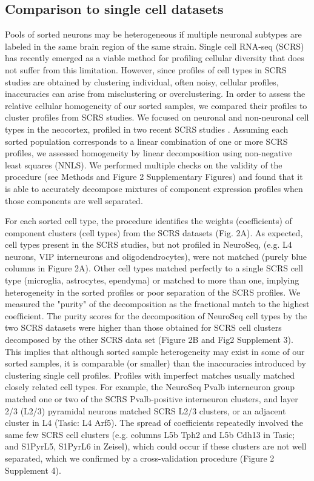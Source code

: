 \subsection{Comparison to single cell datasets}
Pools of sorted neurons may be heterogeneous if multiple neuronal subtypes are labeled in the same brain region of the same strain. Single cell RNA-seq (SCRS) has recently emerged as a viable method for profiling cellular diversity that does not suffer from this limitation. However, since profiles of cell types in SCRS studies are obtained by clustering individual, often noisy, cellular profiles, inaccuracies can arise from misclustering or overclustering. In order to assess the relative cellular homogeneity of our sorted samples, we compared their profiles to cluster profiles from SCRS studies. We focused on neuronal and non-neuronal cell types in the neocortex, profiled in two recent SCRS studies \cite{Tasic_2016,Zeisel_2015}. Assuming  each sorted population corresponds to a linear combination of one or more SCRS profiles, we assessed homogeneity by linear decomposition using non-negative least squares (NNLS). We performed multiple checks on the validity of the procedure (see Methods and Figure 2 Supplementary Figures) and found that it is able to accurately decompose mixtures of component expression profiles when those components are well separated. 

For each sorted cell type, the procedure identifies the weights (coefficients) of  component clusters (cell types) from the SCRS datasets (Fig. 2A). As expected, cell types present in the SCRS studies, but not profiled in NeuroSeq, (e.g. L4 neurons, VIP interneurons and oligodendrocytes), were not matched (purely blue columns in Figure 2A). Other cell types matched perfectly to a single SCRS cell type (microglia, astrocytes, ependyma) or matched to more than one, implying heterogeneity in the sorted profiles or poor separation of the SCRS profiles. We measured the "purity" of the decomposition as the fractional match to the highest coefficient. The purity scores for the decomposition of NeuroSeq cell types by the two SCRS datasets were higher than those obtained for SCRS cell clusters decomposed by the other SCRS data set (Figure 2B and Fig2 Supplement 3). This implies that although sorted sample heterogeneity may exist in some of our sorted samples, it is comparable (or smaller) than the inaccuracies introduced by clustering single cell profiles. Profiles with imperfect matches usually matched closely related cell types. For example, the NeuroSeq Pvalb interneuron group matched one or two of the SCRS Pvalb-positive interneuron clusters, and layer 2/3 (L2/3) pyramidal neurons matched SCRS L2/3 clusters, or an adjacent cluster in L4 (Tasic: L4 Arf5). The spread of coefficients repeatedly involved the same few SCRS cell clusters (e.g. columns L5b Tph2 and L5b Cdh13 in Tasic; and S1PyrL5,  S1PyrL6 in Zeisel), which could occur if these clusters are not well separated, which we confirmed by a cross-validation procedure (Figure 2 Supplement 4).   

